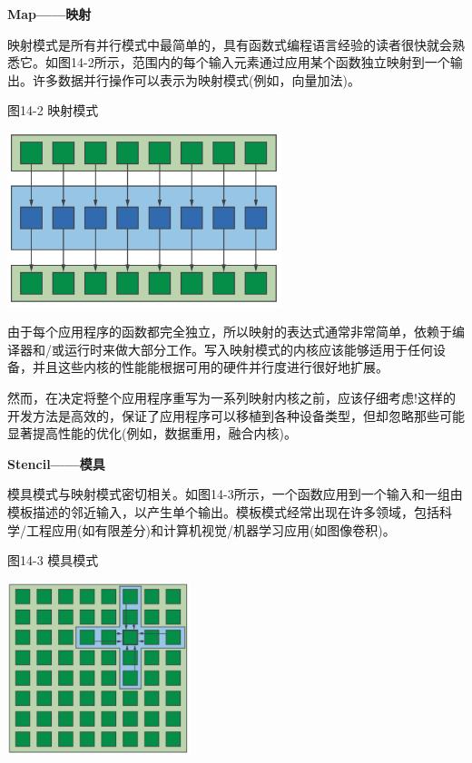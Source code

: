 \hspace*{\fill} \par %
\textbf{Map——映射}

映射模式是所有并行模式中最简单的，具有函数式编程语言经验的读者很快就会熟悉它。如图14-2所示，范围内的每个输入元素通过应用某个函数独立映射到一个输出。许多数据并行操作可以表示为映射模式(例如，向量加法)。\par

\hspace*{\fill} \par %
图14-2 映射模式
\begin{center}
	\includegraphics[width=0.6\textwidth]{content/chapter-14/images/2}
\end{center}

由于每个应用程序的函数都完全独立，所以映射的表达式通常非常简单，依赖于编译器和/或运行时来做大部分工作。写入映射模式的内核应该能够适用于任何设备，并且这些内核的性能能根据可用的硬件并行度进行很好地扩展。\par

然而，在决定将整个应用程序重写为一系列映射内核之前，应该仔细考虑!这样的开发方法是高效的，保证了应用程序可以移植到各种设备类型，但却忽略那些可能显著提高性能的优化(例如，数据重用，融合内核)。\par

\hspace*{\fill} \par %
\textbf{Stencil——模具}

模具模式与映射模式密切相关。如图14-3所示，一个函数应用到一个输入和一组由模板描述的邻近输入，以产生单个输出。模板模式经常出现在许多领域，包括科学/工程应用(如有限差分)和计算机视觉/机器学习应用(如图像卷积)。\par

\hspace*{\fill} \par %
图14-3 模具模式
\begin{center}
	\includegraphics[width=0.4\textwidth]{content/chapter-14/images/3}
\end{center}

